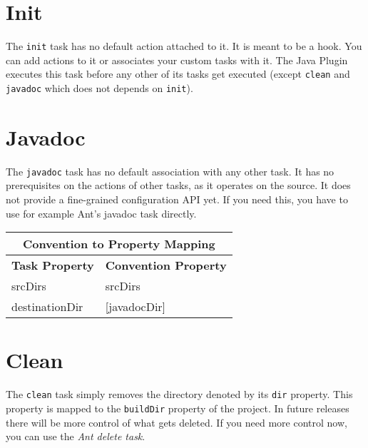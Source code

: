 \section{Init} %
\label{sec:initialization}
The \texttt{init} task has no default action attached to it. It is meant to be a hook. You can add actions to it or associates your custom tasks with it. The Java Plugin executes this task before any other of its tasks get executed (except \texttt{clean} and \texttt{javadoc} which does not depends on \texttt{init}).

\section{Javadoc} %
\label{sec:javadoc}
The \texttt{javadoc} task has no default association with any other task. It has no prerequisites on the actions of other tasks, as it operates on the source. It does not provide a fine-grained configuration API yet. If you need this, you have to use for example Ant's javadoc task directly.
\begin{center}
	\begin{tabular}{|l|l|} \hline
		\multicolumn{2}{|c|}{Convention to Property Mapping} \\ \hline
	    \textbf{Task Property} & \textbf{Convention Property} \\ \hline
		srcDirs & srcDirs \\ \hline
		destinationDir & [javadocDir] \\ \hline
	\end{tabular} 
\end{center} 

\section{Clean} %
\label{sec:clean}
The \texttt{clean} task simply removes the directory denoted by its \texttt{dir} property. This property is mapped to the \texttt{buildDir} property of the project. In future releases there will be more control of what gets deleted. If you need more control now, you can use the \emph{Ant delete task}.  

